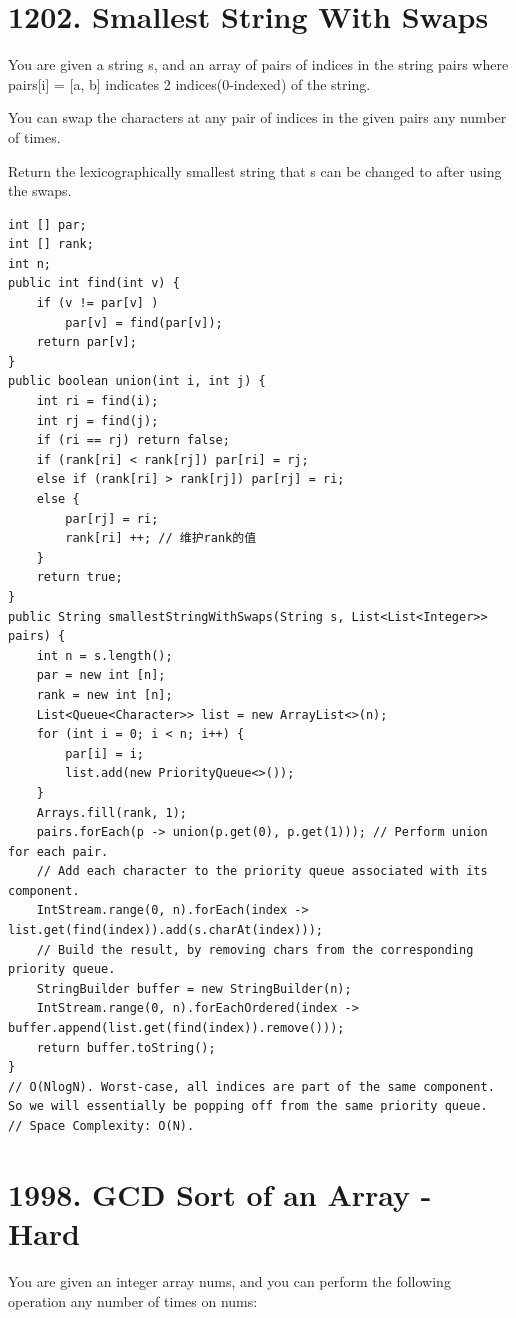 \documentclass[9pt, b5paaper]{book}
\begin{document}
\section{1202. Smallest String With Swaps}
\label{sec-6-5}
You are given a string s, and an array of pairs of indices in the string pairs where pairs[i] = [a, b] indicates 2 indices(0-indexed) of the string.

You can swap the characters at any pair of indices in the given pairs any number of times.

Return the lexicographically smallest string that s can be changed to after using the swaps.
\begin{verbatim}
int [] par;
int [] rank;
int n;
public int find(int v) {
    if (v != par[v] ) 
        par[v] = find(par[v]);
    return par[v];
}
public boolean union(int i, int j) {
    int ri = find(i);
    int rj = find(j);
    if (ri == rj) return false;
    if (rank[ri] < rank[rj]) par[ri] = rj;
    else if (rank[ri] > rank[rj]) par[rj] = ri;
    else {
        par[rj] = ri;
        rank[ri] ++; // 维护rank的值
    }
    return true;
}
public String smallestStringWithSwaps(String s, List<List<Integer>> pairs) {
    int n = s.length();
    par = new int [n];
    rank = new int [n];
    List<Queue<Character>> list = new ArrayList<>(n);
    for (int i = 0; i < n; i++) {
        par[i] = i;
        list.add(new PriorityQueue<>());
    }
    Arrays.fill(rank, 1);
    pairs.forEach(p -> union(p.get(0), p.get(1))); // Perform union for each pair.
    // Add each character to the priority queue associated with its component.
    IntStream.range(0, n).forEach(index -> list.get(find(index)).add(s.charAt(index)));
    // Build the result, by removing chars from the corresponding priority queue.
    StringBuilder buffer = new StringBuilder(n);
    IntStream.range(0, n).forEachOrdered(index -> buffer.append(list.get(find(index)).remove()));
    return buffer.toString();
}
// O(NlogN). Worst-case, all indices are part of the same component. So we will essentially be popping off from the same priority queue.
// Space Complexity: O(N).
\end{verbatim}

\section{1998. GCD Sort of an Array - Hard}
\label{sec-6-6}
You are given an integer array nums, and you can perform the following operation any number of times on nums:
\end{document}
